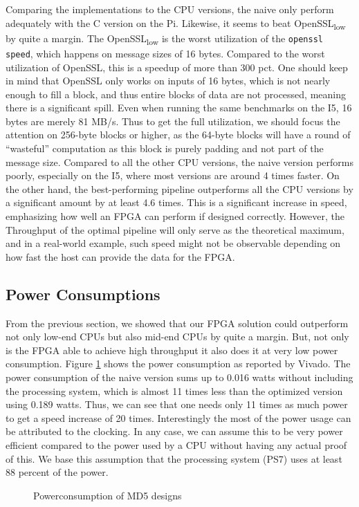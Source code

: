 \documentclass[a4paper, openany]{book}
\begin{document}
\begin{abstact}
Comparing the implementations to the CPU versions, the naive only perform adequately with the C version on the Pi. Likewise, it seems to beat OpenSSL\textsubscript{low} by quite a margin. The OpenSSL\textsubscript{low} is the worst utilization of the \texttt{openssl speed}, which happens on message sizes of 16 bytes. Compared to the worst utilization of OpenSSL, this is a speedup of more than 300 pct. One should keep in mind that OpenSSL only works on inputs of 16 bytes, which is not nearly enough to fill a block, and thus entire blocks of data are not processed, meaning there is a significant spill. Even when running the same benchmarks on the I5, 16 bytes are merely 81 MB/s. Thus to get the full utilization, we should focus the attention on 256-byte blocks or higher, as the 64-byte blocks will have a round of ``wasteful'' computation as this block is purely padding and not part of the message size.
Compared to all the other CPU versions, the naive version performs poorly, especially on the I5, where most versions are around 4 times faster. On the other hand, the best-performing pipeline outperforms all the CPU versions by a significant amount by at least 4.6 times. This is a significant increase in speed, emphasizing how well an FPGA can perform if designed correctly. However, the Throughput of the optimal pipeline will only serve as the theoretical maximum, and in a real-world example, such speed might not be observable depending on how fast the host can provide the data for the FPGA.
\subsection{Power Consumptions}
\label{sec:org9998a73}
From the previous section, we showed that our FPGA solution could outperform not only low-end CPUs but also mid-end CPUs by quite a margin. But, not only is the FPGA able to achieve high throughput it also does it at very low power consumption. Figure \ref{fig:md5_naive_power} shows the power consumption as reported by Vivado. The power consumption of the naive version sums up to 0.016 watts without including the processing system, which is almost 11 times less than the optimized version using 0.189 watts. Thus, we can see that one needs only 11 times as much power to get a speed increase of 20 times. Interestingly the most of the power usage can be attributed to the clocking.
In any case, we can assume this to be very power efficient compared to the power used by a CPU without having any actual proof of this. We base this assumption that the processing system (PS7) uses at least 88 percent of the power.
\begin{figure}[H]
\centering
{}
\caption[Power consumption of MD5 designs]%
{Powerconsumption of MD5 designs}
\label{fig:md5_naive_power}
\end{figure}

\end{abstact}
\end{document}
